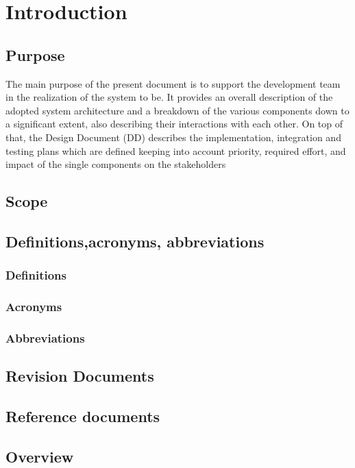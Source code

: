 \section{Introduction}
\subsection{Purpose}
The main purpose of the present document is to support the development team in
the realization of the system to be. It provides an overall description of the adopted
system architecture and a breakdown of the various components down to a
significant extent, also describing their interactions with each other. On top of that,
the Design Document (DD) describes the implementation, integration and testing
plans which are defined keeping into account priority, required effort, and impact of
the single components on the stakeholders
\subsection{Scope}
\subsection{Definitions,acronyms, abbreviations}
    \subsubsection{Definitions}
    \subsubsection{Acronyms}
    \subsubsection{Abbreviations}
\subsection{Revision Documents}
\subsection{Reference documents}
\subsection{Overview}
